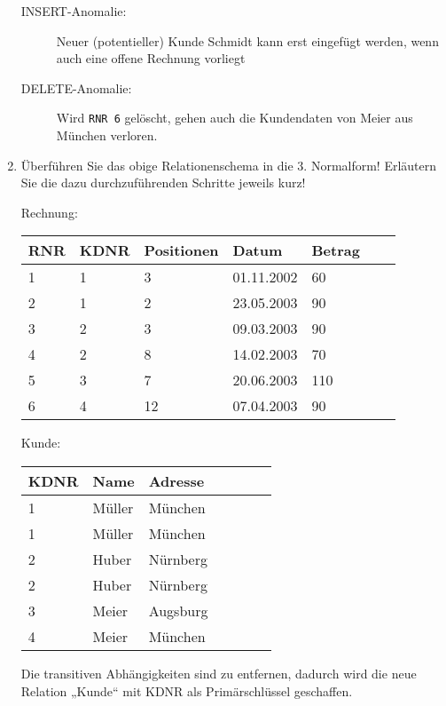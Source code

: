 \documentclass{lehramt-informatik-aufgabe}
\begin{document}
\begin{enumerate}
\begin{liAntwort}
\begin{description}
\item[INSERT-Anomalie:] Neuer (potentieller) Kunde Schmidt kann erst
eingefügt werden, wenn auch eine offene Rechnung vorliegt

\item[DELETE-Anomalie:] Wird \texttt{RNR 6} gelöscht, gehen auch die
Kundendaten von Meier aus München verloren.
\end{description}

\end{liAntwort}


\item Überführen Sie das obige Relationenschema in die 3. Normalform!
Erläutern Sie die dazu durchzuführenden Schritte jeweils kurz!

\begin{liAntwort}

Rechnung:

\begin{tabular}{|l|l|l|l|l|l|l|}
\textbf{RNR} & \textbf{KDNR} & \textbf{Positionen} & \textbf{Datum} & \textbf{Betrag}
\\\hline
1   & 1    & 3  & 01.11.2002 & 60  \\
2   & 1    & 2  & 23.05.2003 & 90  \\
3   & 2    & 3  & 09.03.2003 & 90  \\
4   & 2    & 8  & 14.02.2003 & 70  \\
5   & 3    & 7  & 20.06.2003 & 110 \\
6   & 4    & 12 & 07.04.2003 & 90
\end{tabular}

Kunde:

\begin{tabular}{|l|l|l|l|l|l|l|}
\textbf{KDNR} & \textbf{Name} & \textbf{Adresse}
\\\hline
1 & Müller & München  \\
1 & Müller & München  \\
2 & Huber  & Nürnberg \\
2 & Huber  & Nürnberg \\
3 & Meier  & Augsburg \\
4 & Meier  & München
\end{tabular}

Die transitiven Abhängigkeiten sind zu entfernen, dadurch wird die neue
Relation „Kunde“ mit KDNR als Primärschlüssel geschaffen.
\end{liAntwort}


\end{enumerate}
\end{document}
